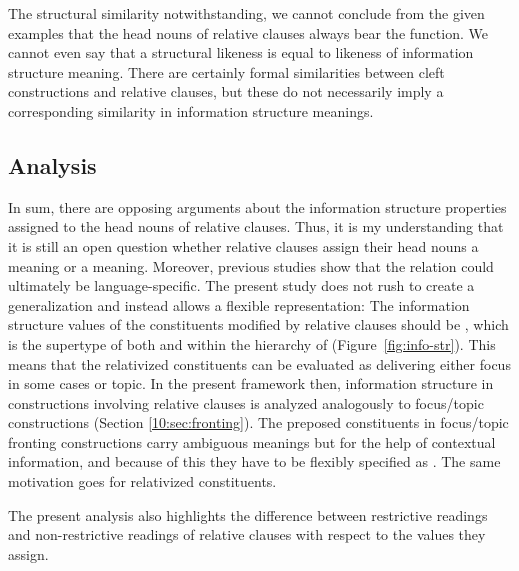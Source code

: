 The structural similarity notwithstanding, we
cannot conclude from the given examples that the head nouns of
relative clauses always bear the  function. We cannot even say
that a structural likeness is equal to likeness of information
structure meaning. There are certainly formal
similarities between cleft constructions and relative clauses, but
these do not necessarily imply a corresponding similarity in
information structure meanings.



\subsection{Analysis}
\label{10:ssec:relative:analysis}

In sum, there are opposing arguments about the information structure
properties assigned to the head nouns of relative clauses. Thus, it is
my understanding that it is still an open question whether relative
clauses assign their head nouns a  meaning or a 
meaning. Moreover, previous studies show that the relation could
ultimately be language-specific. The present study
does not rush to create a generalization and instead allows a flexible
representation: The information structure values of the constituents
modified by relative clauses should be , which is
the supertype of both  and  within the hierarchy
of  (Figure~\ref{fig:info-str}). This means that the
relativized constituents can be evaluated as delivering either focus
in some cases or topic. In the present framework then, information
structure in constructions involving relative clauses is analyzed
analogously to focus/topic  constructions
(Section \ref{10:sec:fronting}). The preposed constituents in focus/topic
fronting constructions carry ambiguous meanings but for the help of
contextual information, and because of this they have to be flexibly
specified as . The same motivation goes for
relativized constituents.



The present analysis also highlights the difference between
restrictive readings and non-restrictive readings of relative clauses
with respect to the  values they assign.


